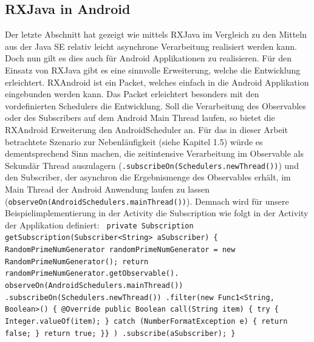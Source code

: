 \documentclass[12pt,oneside,a4paper,bibtotoc,liststotoc]{scrreprt}
\begin{document}
\subsection{RXJava in Android}
Der letzte Abschnitt hat gezeigt wie mittels RXJava im Vergleich zu den Mitteln aus der Java SE relativ leicht asynchrone Verarbeitung realisiert werden kann. Doch nun gilt es dies auch für Android Applikationen zu realisieren. Für den Einsatz von RXJava gibt es eine sinnvolle Erweiterung, welche die Entwicklung erleichtert. RXAndroid ist ein Packet, welches einfach in die Android Applikation eingebunden werden kann. Das Packet erleichtert besonders mit den vordefinierten Schedulers die Entwicklung. Soll die Verarbeitung des Observables oder des Subscribers auf dem Android Main Thread laufen, so bietet die RXAndroid Erweiterung den AndroidScheduler an. Für das in dieser Arbeit betrachtete Szenario zur Nebenläufigkeit (siehe Kapitel 1.5) würde es dementsprechend Sinn machen, die zeitintensive Verarbeitung im Observable als Sekundär Thread auszulagern (\texttt{.subscribeOn(Schedulers.newThread())}) und den Subscriber, der asynchron die Ergebnismenge des Observables erhält, im Main Thread der Android Anwendung laufen zu lassen (\texttt{observeOn(AndroidSchedulers.mainThread())}). Demnach wird für unsere Beispielimplementierung in der Activity die Subscription wie folgt in der Activity der Applikation definiert:\newline
\texttt{\newline
private Subscription getSubscription(Subscriber<String> aSubscriber) \{\newline
       RandomPrimeNumGenerator randomPrimeNumGenerator =\newline 
       new RandomPrimeNumGenerator();\newline
\newline
       return randomPrimeNumGenerator.getObservable().\newline
       observeOn(AndroidSchedulers.mainThread())\newline
               .subscribeOn(Schedulers.newThread())\newline
               .filter(new Func1<String, Boolean>() \{\newline
               \newline
                   @Override\newline
                   public Boolean call(String item) \{\newline
                       try \{\newline
                           Integer.valueOf(item);\newline
                       \} catch (NumberFormatException e) \{\newline
                           return false;\newline
                       \}\newline
                       return true;\newline
               \}\}\newline
               )\newline
               .subscribe(aSubscriber);\newline
   \}\newline
   }\newline
\end{document}
